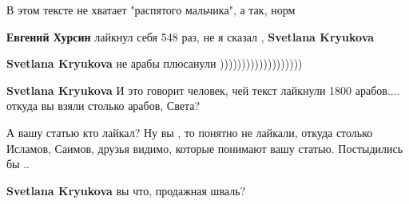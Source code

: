 \begin{itemize}
\begin{itemize}
 
В этом тексте не хватает "распятого мальчика", а так, норм

 
\textbf{Евгений Хурсин} лайкнул себя 548 раз, не я сказал , \textbf{Svetlana Kryukova}

 
\textbf{Svetlana Kryukova} не арабы плюсанули )))))))))))))))))))

 
\textbf{Svetlana Kryukova}
И это говорит человек, чей текст лайкнули 1800 арабов.... откуда вы взяли столько арабов, Света?

 
А вашу статью кто лайкал? Ну вы , то понятно не лайкали, откуда столько Исламов, Саимов, друзья видимо, которые понимают вашу статью. Постыдились бы ..

 
\textbf{Svetlana Kryukova} вы что, продажная шваль?

 

\end{itemize}
\end{itemize}
